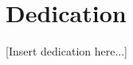 \clearpage
\section*{\centering Dedication}

\vspace*{\fill}
\begin{center}

    [Insert dedication here...]
    
\end{center}
\vspace*{\fill}